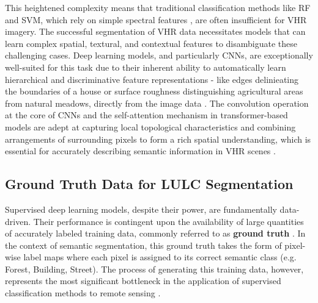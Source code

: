 \documentclass{report}
\begin{document}
This heightened complexity means that traditional classification methods like RF and SVM, which rely on simple spectral features , are often insufficient for VHR imagery. The successful segmentation of VHR data necessitates models that can learn complex spatial, textural, and contextual features to disambiguate these challenging cases. Deep learning models, and particularly CNNs, are exceptionally well-suited for this task due to their inherent ability to automatically learn hierarchical and discriminative feature representations - like edges delinieating the boundaries of a house or surface roughness distinguishing agricultural areas from natural meadows, directly from the image data \parencites[p.~3148]{XuEtAlsemanticsegmentationmethodcategoryboundaryLandUseLandCoverLULCmappingVeryHighResolutionVHRremotesensingimage2021}. The convolution operation at the core of CNNs and the self-attention mechanism in transformer-based models are adept at capturing local topological characteristics and combining arrangements of surrounding pixels to form a rich spatial understanding, which is essential for accurately describing semantic information in VHR scenes \parencites[p.~3147]{XuEtAlsemanticsegmentationmethodcategoryboundaryLandUseLandCoverLULCmappingVeryHighResolutionVHRremotesensingimage2021}.
\subsection{Ground Truth Data for LULC Segmentation}
Supervised deep learning models, despite their power, are fundamentally data-driven. Their performance is contingent upon the availability of large quantities of accurately labeled training data, commonly referred to as \textbf{ground truth} \parencites[p.~1f.]{KaiserEtAlLearningAerialImageSegmentationOnlineMaps2017}. In the context of semantic segmentation, this ground truth takes the form of pixel-wise label maps where each pixel is assigned to its correct semantic class (e.g. Forest, Building, Street). The process of generating this training data, however, represents the most significant bottleneck in the application of supervised classification methods to remote sensing \parencites[p.~1]{KaiserEtAlLearningAerialImageSegmentationOnlineMaps2017}.
\end{document}
